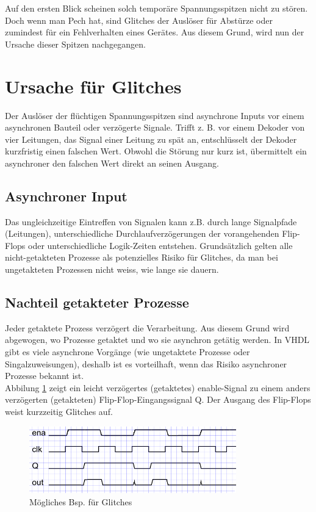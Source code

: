 Auf den ersten Blick scheinen solch temporäre Spannungsspitzen nicht zu stören. Doch wenn man Pech hat, sind Glitches der Auslöser für Abstürze oder zumindest für ein Fehlverhalten eines Gerätes. Aus diesem Grund, wird nun der Ursache dieser Spitzen nachgegangen.\\ 



\section{Ursache für Glitches}\label{sect.glitch_ursache}
Der Auslöser der flüchtigen Spannungsspitzen sind asynchrone Inputs vor einem asynchronen Bauteil oder verzögerte Signale. Trifft z. B. vor einem Dekoder von vier Leitungen, das Signal einer Leitung zu spät an, entschlüsselt der Dekoder kurzfristig einen falschen Wert. Obwohl die Störung nur kurz ist, übermittelt ein asynchroner den falschen Wert direkt an seinen Ausgang. \\

\subsection{Asynchroner Input}
Das ungleichzeitige Eintreffen von Signalen kann z.B. durch lange Signalpfade (Leitungen), unterschiedliche Durchlaufverzögerungen der vorangehenden Flip-Flops oder unterschiedliche Logik-Zeiten entstehen. Grundsätzlich gelten alle nicht-getakteten Prozesse als potenzielles Risiko für Glitches, da man bei ungetakteten Prozessen nicht weiss, wie lange sie dauern.\\

\subsection{Nachteil getakteter Prozesse}
Jeder getaktete Prozess verzögert die Verarbeitung. Aus diesem Grund wird abgewogen, wo Prozesse getaktet und wo sie asynchron getätig werden. In VHDL gibt es viele asynchrone Vorgänge (wie ungetaktete Prozesse oder Singalzuweisungen), deshalb ist es vorteilhaft, wenn das Risiko asynchroner Prozesse bekannt ist.\\


Abbilung \ref{fig.glitch.bild1} zeigt ein leicht verzögertes (getaktetes) enable-Signal zu einem anders verzögerten (getakteten) Flip-Flop-Eingangssignal Q. Der Ausgang des Flip-Flops weist kurzzeitig Glitches auf. \\
\begin{figure}[H]
	\centering
	\includegraphics[width=0.8\textwidth]{images/def_glitch_3.png}
	\caption{Mögliches Bsp. für Glitches}
	\label{fig.glitch.bild1}
\end{figure}



